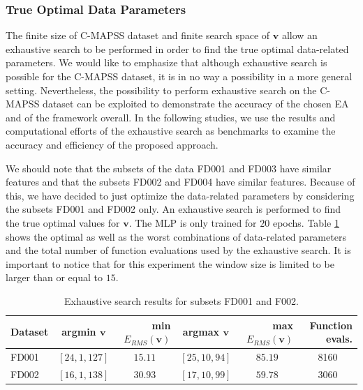 \documentclass[preprint,12pt]{elsarticle}%
\begin{document}
\subsubsection{True Optimal Data Parameters}

The finite size of C-MAPSS dataset and finite search space  of $\mathbf{v}$ allow an exhaustive search to be performed in order to find the true optimal data-related parameters. We would like to emphasize that although exhaustive search is possible for the C-MAPSS dataset, it is in no way a possibility in a more general setting. Nevertheless, the possibility to perform exhaustive search on the C-MAPSS dataset can be exploited to demonstrate the accuracy of the chosen EA and of the framework overall. In the following studies, we use the results and computational efforts of the exhaustive search as benchmarks to examine the accuracy and efficiency of the proposed approach.

We should note that the subsets of the data FD001 and FD003 have similar features and that the subsets FD002 and FD004 have similar features. Because of this, we have decided to just optimize the data-related parameters by considering the subsets FD001 and FD002 only. An exhaustive search is performed to find the true optimal values for $\mathbf{v}$.  The MLP is only trained for $20$ epochs. Table \ref{table:true_optimal_data_params} shows the optimal as well as the worst combinations of data-related parameters and the total number of function evaluations used by the exhaustive search. It is important to notice that for this experiment the window size is limited to be larger than or equal to $15$.

\begin{table}[H]
\begin{center}
\begin{tabular}
[c]{l|crcrr}\hline
Dataset & argmin $\mathbf{v}$ & min $E_{\scriptscriptstyle RMS}(\mathbf{v})$ & argmax $\mathbf{v}$ & max $E_{\scriptscriptstyle RMS}(\mathbf{v})$ & Function evals.\\\hline
FD001 & $\left[  24,1,127\right]  $ & \multicolumn{1}{c}{$15.11$} & $\left[25,10,94\right]  $ & \multicolumn{1}{c}{$85.19$} & \multicolumn{1}{c}{8160}\\
FD002 & $\left[  16,1,138\right]  $ & \multicolumn{1}{c}{$30.93$} & $\left[17,10,99\right]  $ & \multicolumn{1}{c}{$59.78$} & \multicolumn{1}{c}{3060}\\\hline
\end{tabular}
\caption{Exhaustive search results for subsets FD001 and F002.}
\label{table:true_optimal_data_params}
\end{center}
\end{table}
\end{document}
